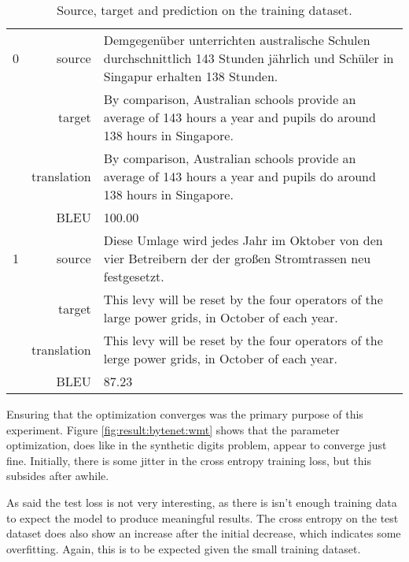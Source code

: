 \begin{table}[h]
\centering
\begin{tabular}{l|r|p{10cm}}
  0 & source & Demgegenüber unterrichten australische Schulen durchschnittlich 143 Stunden jährlich und Schüler in Singapur erhalten 138 Stunden. \\[0.1cm]
    & target & By comparison, Australian schools provide an average of 143 hours a year and pupils do around 138 hours in Singapore. \\[0.1cm]
    & translation & By comparison, Australian schools provide an average of 143 hours a year and pupils do around 138 hours in Singapore. \\[0.1cm]
    & BLEU & 100.00 \\[0.1cm] \hline
  1 & source & Diese Umlage wird jedes Jahr im Oktober von den vier Betreibern der der großen Stromtrassen neu festgesetzt. \\[0.1cm]
    & target & This levy will be reset by the four operators of the large power grids, in October of each year. \\[0.1cm]
    & translation & This levy will be reset by the four operators of the lerge power grids, in October of each year. \\[0.1cm]
    & BLEU & 87.23
\end{tabular}
\caption{Source, target and prediction on the training dataset.}
\label{table:result:bytenet:wmt-train}
\end{table}

Ensuring that the optimization converges was the primary purpose of this experiment. Figure \ref{fig:result:bytenet:wmt} shows that the parameter optimization, does like in the synthetic digits problem, appear to converge just fine. Initially, there is some jitter in the cross entropy training loss, but this subsides after awhile. 

As said the test loss is not very interesting, as there is isn't enough training data to expect the model to produce meaningful results. The cross entropy on the test dataset does also show an increase after the initial decrease, which indicates some overfitting. Again, this is to be expected given the small training dataset.


